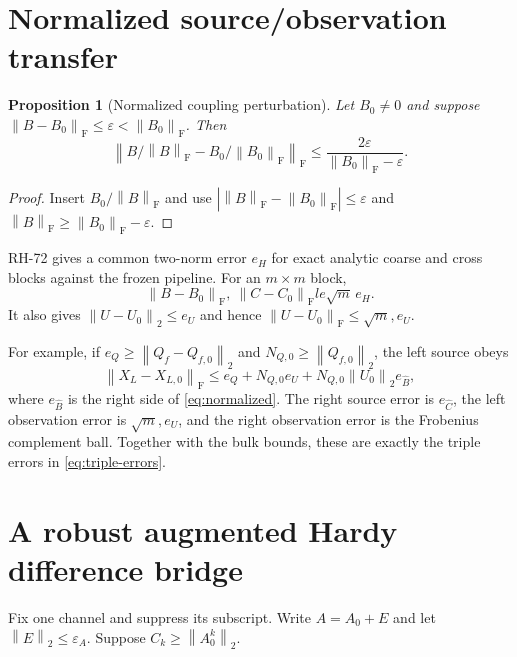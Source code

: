 \documentclass[11pt]{article}
\newtheorem{proposition}[theorem]{Proposition}
\theoremstyle{definition}
\newcommand{\norm}[1]{\left\lVert#1\right\rVert}
\newcommand{\F}{\mathrm F}
\begin{document}
\section{Normalized source/observation transfer}
\label{sec:normalization}

\begin{proposition}[Normalized coupling perturbation]
\label{prop:normalization}
Let $B_0\ne0$ and suppose
$\norm{B-B_0}_{\F}\le\varepsilon<\norm{B_0}_{\F}$.  Then
\begin{equation}
 \norm{B/\norm B_{\F}-B_0/\norm{B_0}_{\F}}_{\F}
 \le\frac{2\varepsilon}{\norm{B_0}_{\F}-\varepsilon}.
 \label{eq:normalized}
\end{equation}
\end{proposition}

\begin{proof}
Insert $B_0/\norm B_{\F}$ and use
$|\norm B_{\F}-\norm{B_0}_{\F}|\le\varepsilon$ and
$\norm B_{\F}\ge\norm{B_0}_{\F}-\varepsilon$.
\end{proof}

RH-72 gives a common two-norm error $e_H$ for exact analytic coarse and cross
blocks against the frozen pipeline.  For an $m\times m$ block,
\begin{equation}
 \norm{B-B_0}_{\F},\ \norm{C-C_0}_{\F}le\sqrt m\,e_H.
 \label{eq:cross-frob}
\end{equation}
It also gives $\norm{U-U_0}_2\le e_U$ and hence
$\norm{U-U_0}_{\F}\le\sqrt m,e_U$.

For example, if $e_Q\ge\norm{Q_f-Q_{f,0}}_2$ and
$N_{Q,0}\ge\norm{Q_{f,0}}_2$, the left source obeys
\begin{equation}
 \norm{X_L-X_{L,0}}_{\F}
 \le e_Q+N_{Q,0}e_U
 +N_{Q,0}\norm{U_0}_2 e_{\widehat B},
 \label{eq:left-source}
\end{equation}
where $e_{\widehat B}$ is the right side of \eqref{eq:normalized}.  The right
source error is $e_{\widehat C}$, the left observation error is
$\sqrt m,e_U$, and the right observation error is the Frobenius complement
ball.  Together with the bulk bounds, these are exactly the triple errors in
\eqref{eq:triple-errors}.

\section{A robust augmented Hardy difference bridge}
\label{sec:hardy}

Fix one channel and suppress its subscript.  Write $A=A_0+E$ and let
$\norm E_2\le\varepsilon_A$.  Suppose $C_k\ge\norm{A_0^k}_2$.
\end{document}
